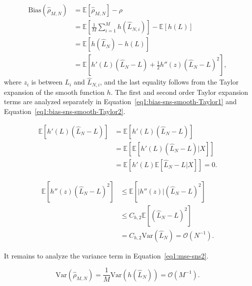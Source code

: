 \begin{align}\label{eq1:bias-sns-smooth}
    \text{Bias}(\hat{\rho}_{M, N})
    & = \mathbb{E} \left[ \hat{\rho}_{M, N} \right] - \rho \nonumber \\
    & = \mathbb{E} \left[ \frac{1}{M} \sum_{i=1}^M h\left( \hat{L}_{N, i} \right) \right] - \mathbb{E} \left[ h\left(L \right) \right]  \nonumber \\
    & = \mathbb{E} \left[ h\left( \hat{L}_N \right) - h\left( L \right) \right] \nonumber \\
    & = \mathbb{E} \left[h'\left( L \right) \left( \hat{L}_N - L \right) + \frac{1}{2} h''\left( z \right) \left( \hat{L}_N - L \right)^2 \right],
\end{align}
where $z_i$ is between $L_i$ and $\hat{L}_{N,i}$, and the last equality follows from the Taylor expansion of the smooth function $h$.
The first and second order Taylor expansion terms are analyzed separately in Equation~\eqref{eq1:bias-sns-smooth-Taylor1} and Equation~\eqref{eq1:bias-sns-smooth-Taylor2}.

\begin{align}\label{eq1:bias-sns-smooth-Taylor1}
    \mathbb{E} \left[ h'\left( L \right) \left( \hat{L}_N - L \right) \right]
    & = \mathbb{E} \left[ h'\left( L \right) \left( \hat{L}_N - L \right) \right] \nonumber \\
    & = \mathbb{E} \left[ \mathbb{E} \left[ h'\left( L \right) \left( \hat{L}_N - L \right)  | X \right] \right] \nonumber \\
    & = \mathbb{E} \left[ h'\left( L \right) \mathbb{E} \left[ \hat{L}_N - L  | X \right] \right] = 0.
\end{align}

\begin{align}\label{eq1:bias-sns-smooth-Taylor2}
    \mathbb{E} \left[ h''\left( z \right) \left( \hat{L}_N - L \right)^2 \right]
    & \leq \mathbb{E} \left[ |h''\left( z \right)| \left( \hat{L}_N - L \right)^2 \right] \nonumber \\
    & \leq C_{h,2} \mathbb{E} \left[ \left( \hat{L}_N - L \right)^2 \right] \nonumber \\
    & = C_{h,2} \text{Var}(\hat{L}_N) = \mathcal{O}\left( N^{-1} \right).
\end{align}

It remains to analyze the variance term in Equation~\eqref{eq1:mse-sns2}.

\begin{equation}\label{eq1:var-sns-smooth}
    \text{Var}(\hat{\rho}_{M, N}) = \frac{1}{M} \text{Var}(h(\hat{L}_N)) = \mathcal{O}(M^{-1}).
\end{equation}

